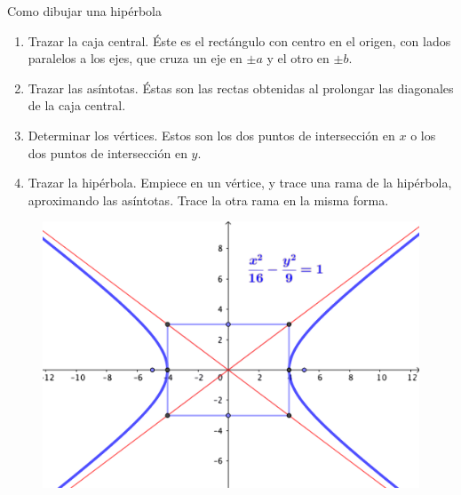 \begin{myalertblock}{Como dibujar una hipérbola}
\vspace{2mm}
\begin{enumerate}
\item Trazar la caja central. Éste es el rectángulo con centro en el origen, con lados paralelos a los ejes, que cruza un eje en $\pm a$ y el otro en $\pm b$.
\item Trazar las asíntotas. Éstas son las rectas obtenidas al prolongar las diagonales de la caja central.
\item Determinar los vértices. Estos son los dos puntos de intersección en $x$ o los dos puntos de intersección en $y$.
\item Trazar la hipérbola. Empiece en un vértice, y trace una rama de la hipérbola, aproximando las asíntotas. Trace la otra rama en la misma forma.
\end{enumerate}
\begin{figure}[H]
	\centering
	\includegraphics[width=.6\textwidth]{img-conicas/conicas35.png}
	\end{figure}
\vspace{2mm}
\end{myalertblock}

